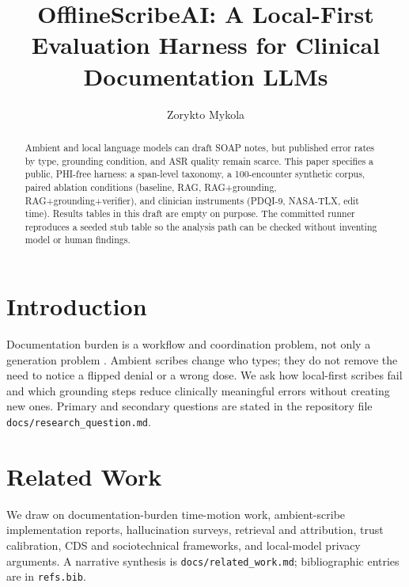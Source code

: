 \documentclass[11pt]{article}
\title{OfflineScribeAI: A Local-First Evaluation Harness for Clinical Documentation LLMs}
\author{Zorykto Mykola}
\date{}
\begin{document}
\maketitle

\begin{abstract}
Ambient and local language models can draft SOAP notes, but published error rates by type, grounding condition, and ASR quality remain scarce. This paper specifies a public, PHI-free harness: a span-level taxonomy, a 100-encounter synthetic corpus, paired ablation conditions (baseline, RAG, RAG+grounding, RAG+grounding+verifier), and clinician instruments (PDQI-9, NASA-TLX, edit time). Results tables in this draft are empty on purpose. The committed runner reproduces a seeded stub table so the analysis path can be checked without inventing model or human findings.
\end{abstract}

\section{Introduction}
Documentation burden is a workflow and coordination problem, not only a generation problem \citep{sinsky2016allocation,arndt2017tethered,sittig2010eight}. Ambient scribes change who types; they do not remove the need to notice a flipped denial or a wrong dose. We ask how local-first scribes fail and which grounding steps reduce clinically meaningful errors without creating new ones. Primary and secondary questions are stated in the repository file \texttt{docs/research\_question.md}.

\section{Related Work}
We draw on documentation-burden time-motion work, ambient-scribe implementation reports, hallucination surveys, retrieval and attribution, trust calibration, CDS and sociotechnical frameworks, and local-model privacy arguments. A narrative synthesis is \texttt{docs/related\_work.md}; bibliographic entries are in \texttt{refs.bib}.
\end{document}
